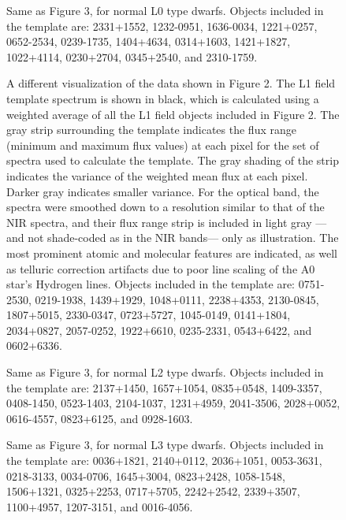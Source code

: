 \documentclass[12pt,preprint]{aastex}
\begin{document}

	\begin{figure}
		\caption{Same as Figure 3, for normal L0 type dwarfs. Objects included in the template are: 2331+1552, 1232-0951, 1636-0034, 1221+0257, 0652-2534, 0239-1735, 1404+4634, 0314+1603, 1421+1827, 1022+4114, 0230+2704, 0345+2540, and 2310-1759.}
		\label{fig:L0field}
	\end{figure}

\begin{figure}
	\caption{A different visualization of the data shown in Figure 2. The L1 field template spectrum is shown in black, which is calculated using a weighted average of all the L1 field objects included in Figure 2. The gray strip surrounding the template indicates the flux range (minimum and maximum flux values) at each pixel for the set of spectra used to calculate the template. The gray shading of the strip indicates the variance of the weighted mean flux at each pixel. Darker gray indicates smaller variance. For the optical band, the spectra were smoothed down to a resolution similar to that of the NIR spectra, and their flux range strip is included in light gray ---and not shade-coded as in the NIR bands--- only as illustration. The most prominent atomic and molecular features are indicated, as well as telluric correction artifacts due to poor line scaling of the A0 star's Hydrogen lines. Objects included in the template are: 0751-2530, 0219-1938, 1439+1929, 1048+0111, 2238+4353, 2130-0845, 1807+5015, 2330-0347, 0723+5727, 1045-0149, 0141+1804, 2034+0827, 2057-0252, 1922+6610, 0235-2331, 0543+6422, and 0602+6336.}
	\label{fig:L1field}
\end{figure}

\begin{figure}
	\caption{Same as Figure 3, for normal L2 type dwarfs. Objects included in the template are: 2137+1450, 1657+1054, 0835+0548, 1409-3357, 0408-1450, 0523-1403, 2104-1037, 1231+4959, 2041-3506, 2028+0052, 0616-4557, 0823+6125, and 0928-1603.}
	\label{fig:L2field}
\end{figure}

\begin{figure}
	\caption{Same as Figure 3, for normal L3 type dwarfs. Objects included in the template are: 0036+1821, 2140+0112, 2036+1051, 0053-3631, 0218-3133, 0034-0706, 1645+3004, 0823+2428, 1058-1548, 1506+1321, 0325+2253, 0717+5705, 2242+2542, 2339+3507, 1100+4957, 1207-3151, and 0016-4056.}
	\label{fig:L3field}
\end{figure}
\end{document}
